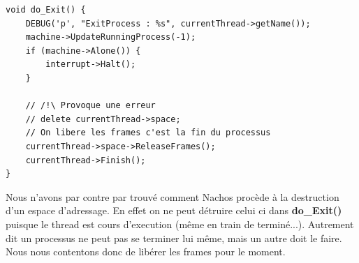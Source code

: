 \documentclass[a4paper,10pt]{article}
\begin{document}
\begin{lstlisting}
void do_Exit() {
    DEBUG('p', "ExitProcess : %s", currentThread->getName());
    machine->UpdateRunningProcess(-1);
    if (machine->Alone()) {
        interrupt->Halt();
    }

    // /!\ Provoque une erreur
    // delete currentThread->space;
    // On libere les frames c'est la fin du processus
    currentThread->space->ReleaseFrames();
    currentThread->Finish();
}
\end{lstlisting}

Nous n'avons par contre par trouvé comment Nachos procède à la destruction
d'un espace d'adressage. En effet on ne peut détruire celui ci dans
\textbf{do\_Exit()} puisque le thread est cours d'execution (même en train de
terminé...). Autrement dit un processus ne peut pas se terminer lui
même, mais un autre doit le faire. Nous nous contentons donc de libérer les
frames pour le moment.
\end{document}
